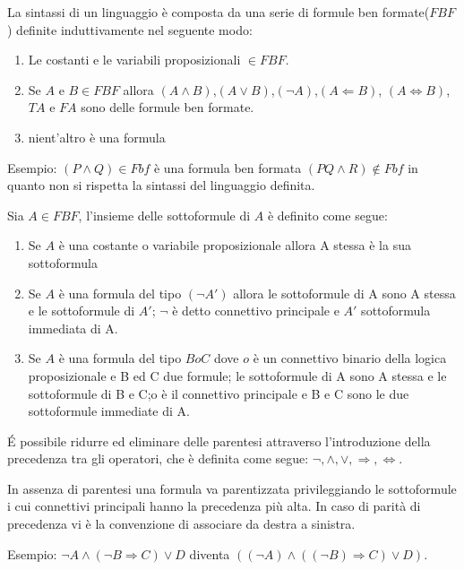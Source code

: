 La sintassi di un linguaggio è composta da una serie di formule ben formate($FBF$) definite
induttivamente nel seguente modo:

\begin{enumerate}
  \item Le costanti e le variabili proposizionali $\in FBF$.
  \item Se $A$ e $B \in FBF$ allora $(A \land B)$,$(A \lor B)$,$(\neg A)$,$(A \Leftarrow B)$,
        $(A \iff B)$,$TA$ e $FA$ sono delle formule ben formate.
  \item nient'altro è una formula
\end{enumerate}

Esempio:\newline
$(P \land Q) \in Fbf$  è una formula ben formata\newline
$(PQ \land R) \not \in Fbf$ in quanto non si rispetta la sintassi del linguaggio definita.\newline

Sia $A \in FBF$, l'insieme delle sottoformule di $A$ è definito come segue:
\begin{enumerate}
\item Se $A$ è una costante o variabile proposizionale allora A stessa è la sua sottoformula
\item Se $A$ è una formula del tipo $(\neg A')$ allora le sottoformule di A sono A stessa e le sottoformule di $A'$;
      $\neg$ è detto connettivo principale e $A'$ sottoformula immediata di A.
\item Se $A$ è una formula del tipo $B o C$ dove $o$ è un connettivo binario della logica proposizionale e B ed C due formule;
      le sottoformule di A sono A stessa e le sottoformule di B e C;o è il connettivo principale e B e C sono le due sottoformule immediate di A.
\end{enumerate}


É possibile ridurre ed eliminare delle parentesi attraverso l'introduzione della
precedenza tra gli operatori, che è definita come segue:\newline
$\neg, \land, \lor, \Rightarrow,\iff$.

In assenza di parentesi una formula va parentizzata privileggiando le sottoformule
i cui connettivi principali hanno la precedenza più alta.\newline
In caso di parità di precedenza vi è la convenzione di associare da destra a sinistra.

Esempio:\newline
$\neg A \land (\neg B \Rightarrow C) \lor D$ diventa
$((\neg A) \land ((\neg B) \Rightarrow C) \lor D)$.

